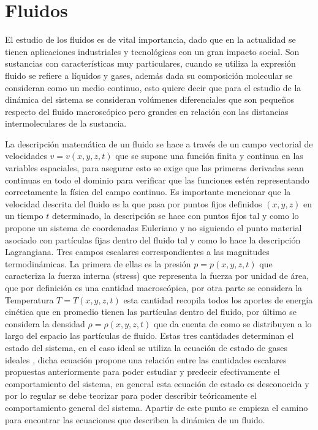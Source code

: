 \chapter{Fluidos}


\noindent El estudio de los fluidos es de vital importancia, dado que en la actualidad se tienen aplicaciones industriales y tecnológicas con un gran impacto social. Son sustancias con características muy particulares, cuando se utiliza la expresión fluido se refiere a líquidos y gases, además dada su composición molecular se consideran como un medio continuo, esto quiere decir que para el estudio de la dinámica del sistema se consideran volúmenes diferenciales que son pequeños respecto del fluido macroscópico pero grandes en relación con las distancias intermoleculares de la sustancia.

\medskip

\noindent La descripción matemática de un fluido se hace a través de un campo vectorial de velocidades $v = v(x,y,z,t)$ que se supone una función finita y continua en las variables espaciales, para asegurar esto se exige que las primeras derivadas sean continuas en todo el dominio para verificar que las funciones estén representando correctamente la física del campo continuo. Es importante mencionar que la velocidad descrita del fluido es la que pasa por puntos fijos definidos $(x,y,z)$ en un tiempo $t$ determinado, la descripción se hace con puntos fijos tal y como lo propone un sistema de coordenadas Euleriano y no siguiendo el punto material asociado con  partículas fijas dentro del fluido tal y como lo hace la descripción Lagrangiana. Tres campos escalares correspondientes a las magnitudes termodinámicas. La primera de ellas es la presión $p = p(x,y,z,t)$ que caracteriza la fuerza interna (stress) que  representa la fuerza por unidad de área, que por definición es una cantidad macroscópica, por otra parte se considera la  Temperatura $T = T(x,y,z,t)$ esta cantidad recopila todos los aportes de energía cinética que en promedio tienen las partículas dentro del fluido, por último se considera la densidad $\rho = \rho(x,y,z,t)$ que da cuenta de como se distribuyen a lo largo del espacio las partículas de fluido. Estas tres cantidades determinan el estado del sistema, en el caso ideal se utiliza la ecuación de estado de gases ideales , dicha ecuación propone una relación entre las cantidades escalares propuestas anteriormente para poder estudiar y predecir efectivamente el comportamiento del sistema, en general esta ecuación de estado es desconocida y por lo regular se debe teorizar para poder describir teóricamente el comportamiento general del sistema. Apartir de este punto se empieza el camino para encontrar las ecuaciones que describen la dinámica de un fluido.




